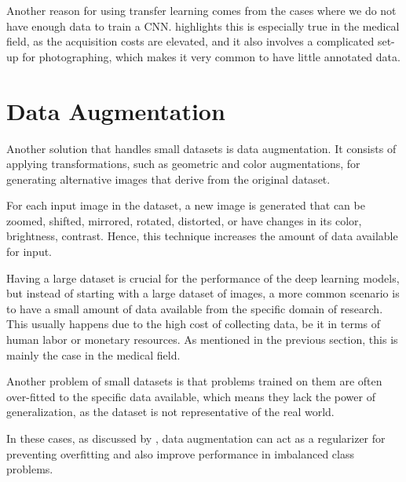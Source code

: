 Another reason for using transfer learning comes from the cases where we do not have enough data to train a CNN. \cite{CelonaBB19} highlights this is especially true in the medical field, as the acquisition costs are elevated, and it also involves a complicated set-up for photographing, which makes it very common to have little annotated data.

\section{Data Augmentation}

Another solution that handles small datasets is data augmentation. It consists of applying transformations, such as geometric and color augmentations, for generating alternative images that derive from the original dataset.

For each input image in the dataset, a new image is generated that can be zoomed, shifted, mirrored, rotated, distorted, or have changes in its color, brightness, contrast. Hence, this technique increases the amount of data available for input. 

Having a large dataset is crucial for the performance of the deep learning models, but instead of starting with a large dataset of images, a more common scenario is to have a small amount of data available from the specific domain of research. This usually happens due to the high cost of collecting data, be it in terms of human labor or monetary resources. As mentioned in the previous section, this is mainly the case in the medical field. 

Another problem of small datasets is that problems trained on them are often over-fitted to the specific data available, which means they lack the power of generalization, as the dataset is not representative of the real world. 

In these cases, as discussed by \cite{abs-1712-04621}, data augmentation can act as a regularizer for preventing overfitting and also improve performance in imbalanced class problems.

